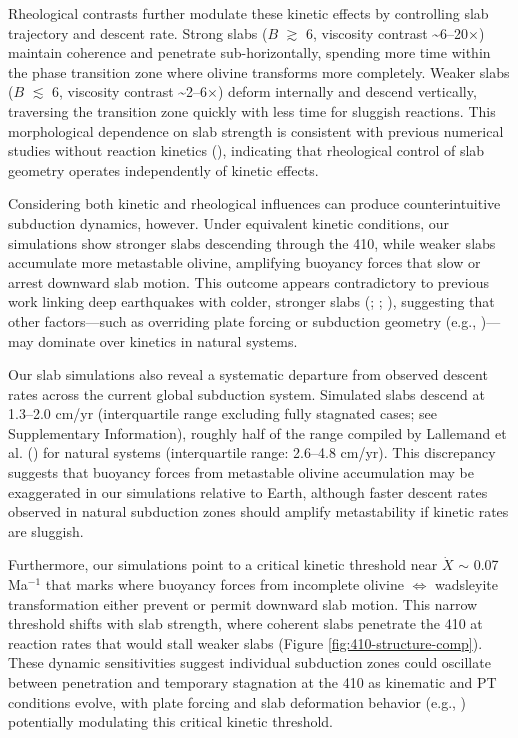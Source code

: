 \documentclass[
  paper=a4,
  ,captions=tableheading
]{scrartcl}
\begin{document}
Rheological contrasts further modulate these kinetic effects by
controlling slab trajectory and descent rate. Strong slabs (\(B\)
\(\gtrsim\) 6, viscosity contrast \textasciitilde6--20\(\times\))
maintain coherence and penetrate sub-horizontally, spending more time
within the phase transition zone where olivine transforms more
completely. Weaker slabs (\(B\) \(\lesssim\) 6, viscosity contrast
\textasciitilde2--6\(\times\)) deform internally and descend vertically,
traversing the transition zone quickly with less time for sluggish
reactions. This morphological dependence on slab strength is consistent
with previous numerical studies without reaction kinetics
(), indicating that
rheological control of slab geometry operates independently of kinetic
effects.

Considering both kinetic and rheological influences can produce
counterintuitive subduction dynamics, however. Under equivalent kinetic
conditions, our simulations show stronger slabs descending through the
410, while weaker slabs accumulate more metastable olivine, amplifying
buoyancy forces that slow or arrest downward slab motion. This outcome
appears contradictory to previous work linking deep earthquakes with
colder, stronger slabs (; ;
), suggesting that other
factors---such as overriding plate forcing or subduction geometry (e.g.,
)---may dominate over
kinetics in natural systems.

Our slab simulations also reveal a systematic departure from observed
descent rates across the current global subduction system. Simulated
slabs descend at 1.3--2.0 cm/yr (interquartile range excluding fully
stagnated cases; see Supplementary Information), roughly half of the
range compiled by Lallemand et al. ()
for natural systems (interquartile range: 2.6--4.8 cm/yr). This
discrepancy suggests that buoyancy forces from metastable olivine
accumulation may be exaggerated in our simulations relative to Earth,
although faster descent rates observed in natural subduction zones
should amplify metastability if kinetic rates are sluggish.

Furthermore, our simulations point to a critical kinetic threshold near
\(\dot{X}\) \(\sim\) 0.07 Ma\(^{-1}\) that marks where buoyancy forces
from incomplete olivine \(\Leftrightarrow\) wadsleyite transformation
either prevent or permit downward slab motion. This narrow threshold
shifts with slab strength, where coherent slabs penetrate the 410 at
reaction rates that would stall weaker slabs (Figure
\ref{fig:410-structure-comp}). These dynamic sensitivities suggest
individual subduction zones could oscillate between penetration and
temporary stagnation at the 410 as kinematic and PT conditions evolve,
with plate forcing and slab deformation behavior (e.g.,
) potentially modulating
this critical kinetic threshold.
\end{document}
